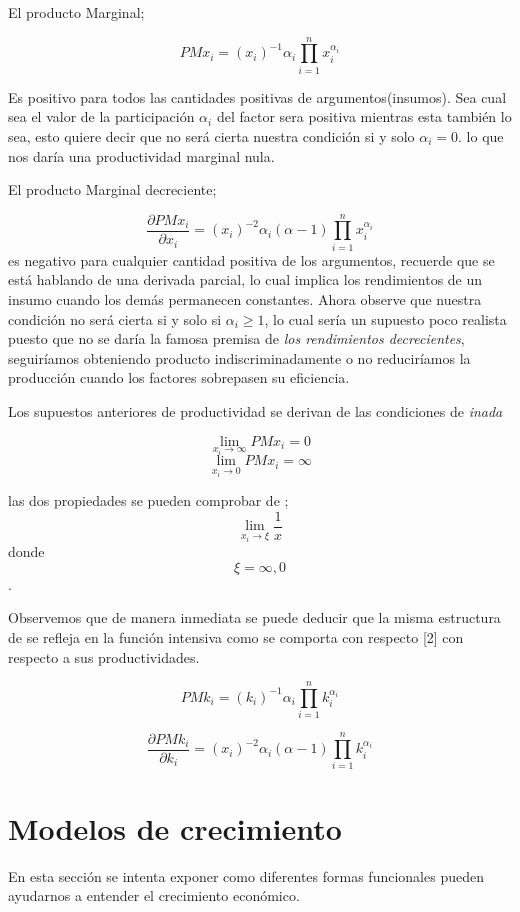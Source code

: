 \documentclass[12pt]{article}
\begin{document}
El producto Marginal; 

$$PMx_i=(x_i)^{-1}\alpha_i\prod_{i=1}^nx_i^{\alpha_i}$$

Es positivo para todos las cantidades positivas de argumentos(insumos). Sea cual sea el valor de la participación $\alpha_i$ del factor sera positiva mientras esta también lo sea, esto quiere decir que no será cierta nuestra condición si y solo $\alpha_{i}=0$. lo que nos daría una productividad marginal nula.


El producto Marginal decreciente;

$$\frac{\partial PMx_i}{\partial x_i}=(x_i)^{-2}\alpha_i(\alpha - 1)\prod_{i=1}^nx_i^{\alpha_i}$$
es negativo para cualquier cantidad positiva de los argumentos, recuerde que se está hablando de una derivada parcial, lo cual implica los rendimientos de un insumo cuando los demás permanecen constantes. Ahora observe que nuestra condición no será cierta si y solo si $\alpha_i \geq 1$, lo cual sería un supuesto poco realista puesto que no se daría la famosa premisa de \textit{los rendimientos decrecientes}, seguiríamos obteniendo producto indiscriminadamente o no reduciríamos la producción cuando los factores sobrepasen su eficiencia.





Los supuestos anteriores de productividad se derivan de las condiciones de \textit{inada}

$$\lim_{x_i\longrightarrow \infty}PMx_i=0$$
$$\lim_{x_i\longrightarrow 0}PMx_i=\infty$$

\newpage
las dos propiedades se pueden comprobar de ;
$$\lim_{x_i\longrightarrow \xi}\frac{1}{x}$$ donde $$ {\xi=\infty, 0}$$.



Observemos que de manera inmediata se puede deducir que la misma estructura de se refleja en la función intensiva como se comporta con respecto [2] con respecto a sus productividades.



$$PMk_i=(k_i)^{-1}\alpha_i\prod_{i=1}^nk_i^{\alpha_i}$$




$$\frac{\partial PMk_i}{\partial k_i}=(x_i)^{-2}\alpha_i(\alpha - 1)\prod_{i=1}^nk_i^{\alpha_i}$$

\section{Modelos de crecimiento}
En esta sección se intenta exponer como diferentes formas funcionales pueden ayudarnos a entender el crecimiento económico.
\end{document}
